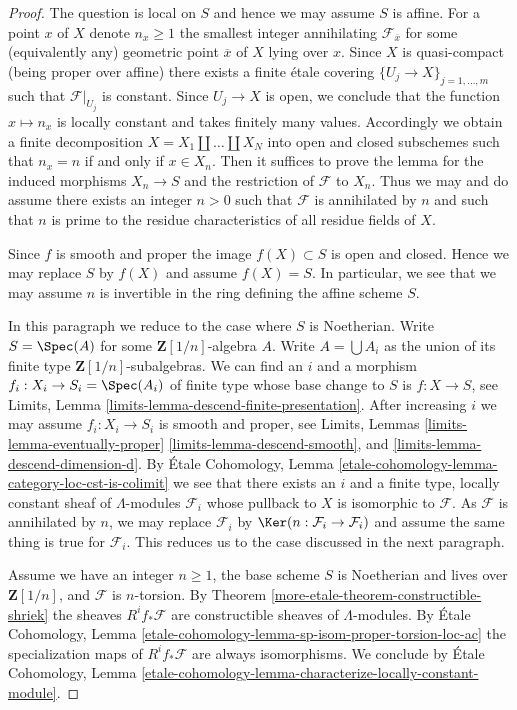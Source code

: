 \begin{proof}
The question is local on $S$ and hence we may assume $S$ is affine.
For a point $x$ of $X$ denote $n_x \geq 1$
the smallest integer annihilating $\mathcal{F}_{\overline{x}}$
for some (equivalently any) geometric point $\overline{x}$ of $X$
lying over $x$. Since $X$ is quasi-compact (being proper over affine)
there exists a finite \'etale covering $\{U_j \to X\}_{j = 1, \ldots, m}$
such that $\mathcal{F}|_{U_j}$ is constant. Since $U_j \to X$
is open, we conclude that the function $x \mapsto n_x$ is locally
constant and takes finitely many values. Accordingly we
obtain a finite decomposition $X = X_1 \amalg \ldots \amalg X_N$
into open and closed subschemes such that $n_x = n$ if and only if $x \in X_n$.
Then it suffices to prove the lemma for the induced
morphisms $X_n \to S$ and the restriction of $\mathcal{F}$ to $X_n$.
Thus we may and do assume there exists an integer $n > 0$ such
that $\mathcal{F}$ is annihilated by $n$ and such that $n$
is prime to the residue characteristics of all residue fields of $X$.

\medskip\noindent
Since $f$ is smooth and proper the image $f(X) \subset S$ is open and closed.
Hence we may replace $S$ by $f(X)$ and assume $f(X) = S$. In particular,
we see that we may assume $n$ is invertible in the ring defining the
affine scheme $S$.

\medskip\noindent
In this paragraph we reduce to the case where $S$ is Noetherian.
Write $S = \Spec(A)$ for some $\mathbf{Z}[1/n]$-algebra $A$.
Write $A = \bigcup A_i$ as the union of its finite type
$\mathbf{Z}[1/n]$-subalgebras. We can find an $i$ and a morphism
$f_i : X_i \to S_i = \Spec(A_i)$ of finite
type whose base change to $S$ is $f : X \to S$, see
Limits, Lemma \ref{limits-lemma-descend-finite-presentation}.
After increasing $i$ we may assume $f_i : X_i \to S_i$ is
smooth and proper, see Limits, Lemmas
\ref{limits-lemma-eventually-proper}
\ref{limits-lemma-descend-smooth}, and
\ref{limits-lemma-descend-dimension-d}.
By \'Etale Cohomology, Lemma
\ref{etale-cohomology-lemma-category-loc-cst-is-colimit}
we see that there exists an $i$ and a finite type,
locally constant sheaf of $\Lambda$-modules
$\mathcal{F}_i$ whose pullback to $X$ is isomorphic to $\mathcal{F}$.
As $\mathcal{F}$ is annihilated by $n$, we may replace
$\mathcal{F}_i$ by $\Ker(n : \mathcal{F}_i \to \mathcal{F}_i)$
and assume the same thing is true for $\mathcal{F}_i$.
This reduces us to the case discussed in the next paragraph.

\medskip\noindent
Assume we have an integer $n \geq 1$, the base scheme $S$ is Noetherian
and lives over $\mathbf{Z}[1/n]$, and $\mathcal{F}$ is $n$-torsion.
By Theorem \ref{more-etale-theorem-constructible-shriek}
the sheaves $R^if_*\mathcal{F}$ are constructible sheaves of $\Lambda$-modules.
By \'Etale Cohomology, Lemma
\ref{etale-cohomology-lemma-sp-isom-proper-torsion-loc-ac}
the specialization maps of $R^if_*\mathcal{F}$ are always isomorphisms.
We conclude by \'Etale Cohomology, Lemma
\ref{etale-cohomology-lemma-characterize-locally-constant-module}.
\end{proof}

